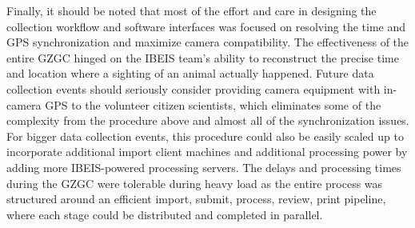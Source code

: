 Finally, it should be noted that most of the effort and care in designing the collection workflow and software interfaces was focused on resolving the time and GPS synchronization and maximize camera compatibility.  The effectiveness of the entire GZGC hinged on the IBEIS team's ability to reconstruct the precise time and location where a sighting of an animal actually happened.  Future data collection events should seriously consider providing camera equipment with in-camera GPS to the volunteer citizen scientists, which eliminates some of the complexity from the procedure above and almost all of the synchronization issues.  For bigger data collection events, this procedure could also be easily scaled up to incorporate additional import client machines and additional processing power by adding more IBEIS-powered processing servers.  The delays and processing times during the GZGC were tolerable during heavy load as the entire process was structured around an efficient import, submit, process, review, print pipeline, where each stage could be distributed and completed in parallel.  
